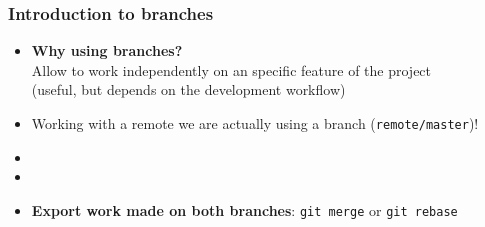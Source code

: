 \documentclass[xcolor=dvipsnames,10pt]{beamer}
\begin{document}
\begin{frame}
 \frametitle{Introduction to branches}
 
 \begin{itemize}  
  \item \textbf{Why using branches?}\\
  Allow to work independently on an specific feature of the project\\
  (useful, but depends on the development workflow)
 \end{itemize}
 
 \begin{itemize}
 \small
  \item Working with a remote we are actually using a branch (\texttt{remote/master})!
 \end{itemize}
 
 
 
 \begin{itemize}
  \item {}
  \vspace*{0.1cm}
  
  \item<3-> 
  \vspace*{0.1cm}
  
  \item<4-> \textbf{Export work made on both branches}: \texttt{git merge} or \texttt{git rebase}
 \end{itemize}



 
 
\end{frame}
\end{document}
